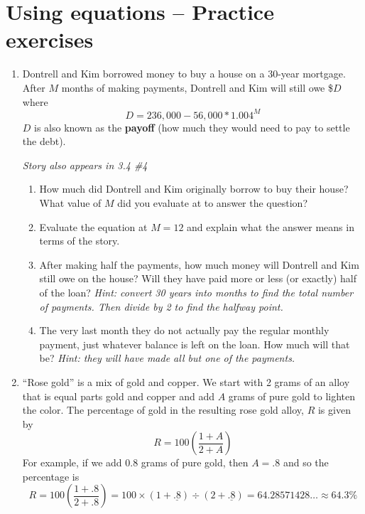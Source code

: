 
\section{Using equations  -- Practice exercises} 

\begin{enumerate}

\item Dontrell and Kim borrowed money to buy a house on a 30-year mortgage.  
After $M$ months of making payments, Dontrell and Kim will still owe \$$D$ where 
$$D=236,000-56,000 \ast 1.004^M$$  
$D$ is also known as the \textbf{payoff} (how much they would need to pay to settle the debt).

 \hfill \emph{Story also appears in 3.4 \#4}
 \begin{enumerate}
\item How much did Dontrell and Kim originally borrow to buy their house?  What value of $M$ did you evaluate at to answer the question? \vfill
\item Evaluate the equation at $M=12$ and explain what the answer means in terms of the story. \vfill
\item After making half the payments, how much money will Dontrell and Kim still owe on the house?  Will they have paid more or less (or exactly) half of the loan?  \emph{Hint:  convert 30 years into months to find the total number of payments.  Then divide by 2 to find the halfway point.} \vfill
\item The very last month they do not actually pay the regular monthly payment, just whatever balance is left on the loan.  How much will that be? \emph{Hint:  they will have made all but one of the payments.} \vfill
\end{enumerate}

\newpage %

\item ``Rose gold'' is a mix of gold and copper.  We start with 2 grams of an alloy that is equal parts gold and copper and add $A$ grams of pure gold to lighten the color. The percentage of gold in the resulting rose gold alloy, $R$ is given by $$R = 100\left(\frac{1+A}{2+A}\right)$$
For example, if we add 0.8 grams of pure gold, then $A=.8$ and so the percentage is $$R=100\left(\frac{1+.8}{2+.8}\right)= 100 \times (1 + \underline{.8})\div(2+\underline{.8})=64.28571428\ldots \approx 64.3\%$$ 


\end{enumerate}
